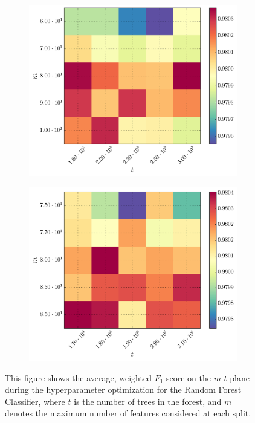 \begin{figure}[h]
	\begin{subfigure}[t]{0.49\textwidth}
		\centering
		\includegraphics[width=\textwidth]{figures/gridsearch/rf/superclasses/rf-superclasses-03.png}				
	\end{subfigure}
	\begin{subfigure}[t]{0.49\textwidth}
		\centering
		\includegraphics[width=\textwidth]{figures/gridsearch/rf/superclasses/rf-superclasses-04.png}		
	\end{subfigure}		
	\caption[Hyperparameter optimization for the Random Forest Classifier]{This figure shows the average, weighted $F_1$ score on the $m$-$t$-plane during the hyperparameter optimization for the Random Forest Classifier, where $t$ is the number of trees in the forest, and $m$ denotes the maximum number of features considered at each split.}
	\label{fig:gridsearch-rf-superclasses}
\end{figure}

